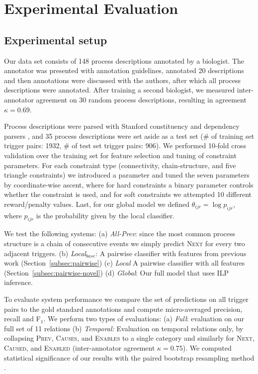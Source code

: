 \section{Experimental Evaluation}

\subsection{Experimental setup} \label{subsec:setup}

Our data set consists of 148 process descriptions annotated by a biologist. The annotator was presented with annotation guidelines, annotated 20 descriptions and then annotations were discussed with the authors, after which all process descriptions were annotated. After training a second biologist, we measured inter-annotator agreement on 30 random process descriptions, resulting in agreement $\kappa=0.69$. 

Process descriptions were parsed with Stanford constituency and dependency parsers \cite{Klein03,Marneffe06}, and 35 process descriptions were set aside as a test set (\# of training set trigger pairs: 1932, \# of test set trigger pairs: 906). We performed 10-fold cross validation over the training set for feature selection and tuning of constraint parameters. For each constraint type (connectivity, chain-structure, and five triangle constraints) we introduced a parameter and tuned the seven parameters by coordinate-wise ascent, where for hard constraints a binary parameter controls whether the constraint is used, and for soft constraints we attempted 10 different reward/penalty values. Last, for our global model we defined $\theta_{ijr}=\log p_{ijr}$, where $p_{ijr}$ is the probability given by the local classifier.

We test the following systems: (a) \emph{All-Prev}: since the most common process structure is a chain of consecutive events we simply predict \textsc{Next} for every two adjacent triggers. (b) \emph{Local$_{base}$}: A pairwise classifier with features from previous work (Section~\ref{subsec:pairwise}) (c) \emph{Local} A pairwise classifier with all features (Section~\ref{subsec:pairwise-novel}) (d) \emph{Global}: Our full model that uses ILP inference.


To evaluate system performance we compare the set of predictions on all trigger pairs to the gold standard annotations and compute micro-averaged precision, recall and F$_1$. We perform two types of evaluations: (a) \emph{Full}: evaluation on our full set of 11 relations (b) \emph{Temporal:} Evaluation on temporal relations only, by collapsing \textsc{Prev}, \textsc{Causes}, and \textsc{Enables} to a single category and similarly for \textsc{Next}, \textsc{Caused}, and \textsc{Enabled} (inter-annotator agreement $\kappa=0.75$). We computed statistical significance of our results with the paired bootstrap resampling method \cite{efron1993}.

